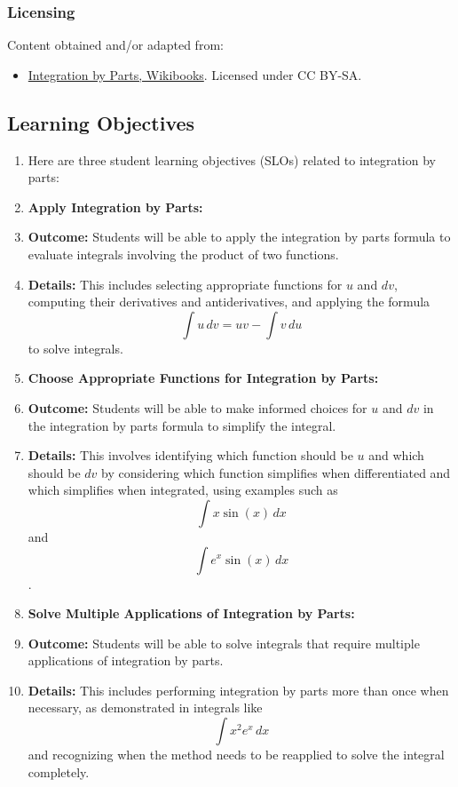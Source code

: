 \subsubsection{Licensing}
\label{sss:lice-7352}

Content obtained and/or adapted from:

\begin{itemize}

\item \href{https://en.wikibooks.org/wiki/Calculus/Integration_techniques/Integration_by_Parts}{Integration by Parts, Wikibooks}.  
Licensed under CC BY-SA.

\end{itemize}

\subsection{Learning Objectives}

\begin{enumerate}
    \item Here are three student learning objectives (SLOs) related to integration by parts:
    \item \textbf{Apply Integration by Parts:}
    \item \textbf{Outcome:} Students will be able to apply the integration by parts formula to evaluate integrals involving the product of two functions.
    \item \textbf{Details:} This includes selecting appropriate functions for $u$ and $dv$, computing their derivatives and antiderivatives, and applying the formula \[
\int u \, dv = uv - \int v \, du
\] to solve integrals.
    \item \textbf{Choose Appropriate Functions for Integration by Parts:}
    \item \textbf{Outcome:} Students will be able to make informed choices for $u$ and $dv$ in the integration by parts formula to simplify the integral.
    \item \textbf{Details:} This involves identifying which function should be $u$ and which should be $dv$ by considering which function simplifies when differentiated and which simplifies when integrated, using examples such as \[
\int x \sin(x) \, dx
\] and \[
\int e^x \sin(x) \, dx
\].
    \item \textbf{Solve Multiple Applications of Integration by Parts:}
    \item \textbf{Outcome:} Students will be able to solve integrals that require multiple applications of integration by parts.
    \item \textbf{Details:} This includes performing integration by parts more than once when necessary, as demonstrated in integrals like \[
\int x^2 e^x \, dx
\] and recognizing when the method needs to be reapplied to solve the integral completely.
\end{enumerate}

